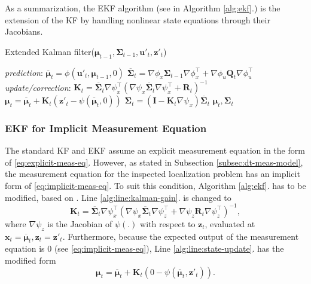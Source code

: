 As a summarization, the EKF algorithm (see in Algorithm \ref{alg:ekf}.) is the extension of the KF by handling nonlinear state equations through their Jacobians.

\begin{algorithm}
    \caption{Extended Kalman filter($\boldsymbol{\mu}_{t-1},\mathbf{\Sigma}_{t-1},\mathbf{u}'_t,\mathbf{z}'_t$)}\label{alg:ekf}
    \begin{algorithmic}[1]
        \BState \emph{prediction}:
        \State\indent$\overline{\boldsymbol{\mu}}_t = \phi(\mathbf{u}'_t,\boldsymbol{\mu}_{t-1},0)$
        \State\indent $\overline{\mathbf{\Sigma}}_t = \nabla \phi_x\mathbf{\Sigma}_{t-1}\nabla \phi_x^{\top} +
            \nabla \phi _u\mathbf{Q}_t \nabla \phi_u^{\top}$
        \BState \emph{update/correction}:
        \State\indent $\mathbf{K}_t = \overline{\mathbf{\Sigma}}_t\nabla \psi_x^\top\left(\nabla \psi_x\overline{\mathbf{\Sigma}}_t\nabla \psi_x^\top+\mathbf{R}_t\right)^{-1}$ \label{alg:line:kalman-gain}
        \State\indent $\boldsymbol{\mu}_t = \overline{\boldsymbol{\mu}}_t + \mathbf{K}_t\left(\mathbf{z}'_t-\psi(\overline{\boldsymbol{\mu}}_t,0)\right)$ \label{alg:line:state-update}
        \State\indent $\mathbf{\Sigma}_t = \left(\mathbf{I}-\mathbf{K}_t\nabla \psi_x\right)\overline{\mathbf{\Sigma}}_t$
        \State\Return $\boldsymbol{\mu}_t,\mathbf{\Sigma}_t$
    \end{algorithmic}
\end{algorithm}

\subsubsection{EKF for Implicit Measurement Equation}

The standard KF and EKF assume an explicit measurement equation in the form of \eqref{eq:explicit-meas-eq}.
However, as stated in Subsection \ref{subsec:dt-meas-model}, the measurement equation for the inspected
localization problem has an implicit form of \eqref{eq:implicit-meas-eq}.
To suit this condition, Algorithm \ref{alg:ekf}. has to be modified, based on \cite{Steffen2013,Zhang2012}.
Line \ref{alg:line:kalman-gain}. is changed to
\begin{equation}
    \mathbf{K}_t = \overline{\mathbf{\Sigma}}_t\nabla \psi_x^\top\left(\nabla \psi_x\overline{\mathbf{\Sigma}}_t\nabla \psi_z^\top+
    \nabla \psi_z\mathbf{R}_t\nabla \psi^{\top}_z\right)^{-1},
\end{equation}
where $\nabla \psi_z$ is the Jacobian of $\psi(.)$ with respect to $\mathbf{z}_t$, evaluated at
$\mathbf{x}_t = \overline{\boldsymbol{\mu}}_t, \mathbf{z}_t = \mathbf{z}'_t$.
Furthermore, because the expected output of the measurement equation is 0 (see \eqref{eq:implicit-meas-eq}), Line \ref{alg:line:state-update}. has the modified form
\begin{equation}
    \boldsymbol{\mu}_t = \overline{\boldsymbol{\mu}}_t + \mathbf{K}_t\left(0-\psi(\overline{\boldsymbol{\mu}}_t,\mathbf{z}'_t)\right).
\end{equation}
